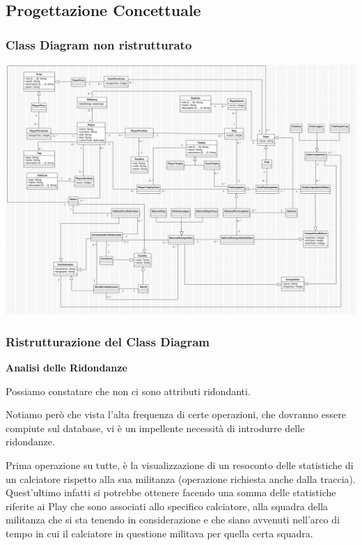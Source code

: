 \subsection{\Large Progettazione Concettuale}

\newpage

\subsubsection{\Large Class Diagram non ristrutturato}

\includegraphics[width=\textwidth]{res/class_diagram_not_restr}
\newpage

\subsubsection{\Large Ristrutturazione del Class Diagram}

\textbf{\large Analisi delle Ridondanze}

Possiamo constatare che non ci sono attributi ridondanti.

Notiamo però che vista l'alta frequenza di certe operazioni, 
che dovranno essere compiute sul database, vi è
un impellente necessità di introdurre delle ridondanze.


Prima operazione su tutte, è la visualizzazione di un 
resoconto delle statistiche di un calciatore rispetto alla 
sua militanza
(operazione richiesta anche dalla traccia).
Quest'ultimo infatti si potrebbe ottenere facendo una somma 
delle  statistiche riferite ai Play che sono associati allo 
specifico calciatore, alla squadra della militanza che si sta 
tenendo in considerazione e che siano avvenuti nell'arco di 
tempo in cui il calciatore in questione militava per quella 
certa squadra.



